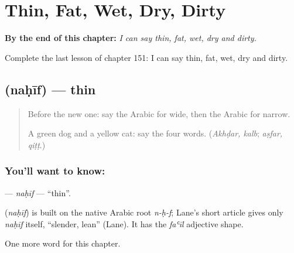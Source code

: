 
\chapter{Thin, Fat, Wet, Dry, Dirty}
\label{ch:ar-thin-fat-wet-dry-dirty}

\begin{chapteropening}
\textbf{By the end of this chapter:} \emph{I can say thin, fat, wet, dry and dirty.}

Complete the last lesson of chapter 151: I can say thin, fat, wet, dry and dirty.
\end{chapteropening}

\section[\texorpdfstring{\ar{نحيف} (naḥīf)}{نحيف (naḥīf)}]{ (naḥīf) — thin}

\label{lesson:AR-C151-nahif}



\begin{quote}
Before the new one: say the Arabic for wide, then the Arabic for narrow.

A green dog and a yellow cat: say the four words. (\emph{Akhḍar, kalb}; \emph{aṣfar, qiṭṭ}.)
\end{quote}

\subsection*{You'll want to know: }
\textbf{} — \emph{naḥīf} — \textquotedblleft{}thin\textquotedblright{}.

\begin{cousinweb}
\textbf{} (\emph{naḥīf}) is built on the native Arabic root \emph{n-ḥ-f}; Lane's short article gives only \emph{naḥīf} itself, \textquotedblleft{}slender, lean\textquotedblright{} (Lane). It has the \emph{faʿīl} adjective shape.
\end{cousinweb}

\begin{grammarlens}[title={What you've built}]
One more word for this chapter.
\end{grammarlens}

